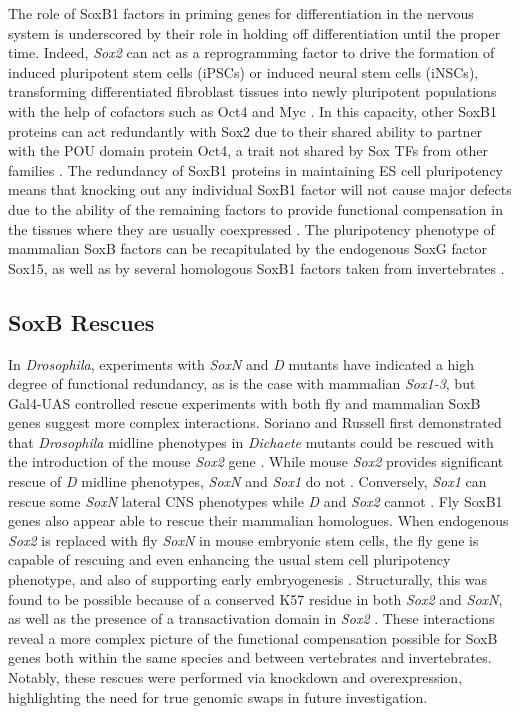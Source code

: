 \documentclass[withindex,glossary]{cam-thesis}
\begin{document}
The role of SoxB1 factors in priming genes for differentiation in the
nervous system is underscored by their role in holding off
differentiation until the proper time. Indeed, \emph{Sox2} can act as a
reprogramming factor to drive the formation of induced pluripotent stem
cells (\gls{iPSCs}) or induced neural stem cells (\gls{iNSCs}), transforming
differentiated fibroblast tissues into newly pluripotent populations
with the help of cofactors such as Oct4 and Myc . In this capacity, other SoxB1
proteins can act redundantly with Sox2 due to their shared ability to
partner with the POU domain protein Oct4, a trait not shared by Sox TFs
from other families . The redundancy of SoxB1
proteins in maintaining ES cell pluripotency means that knocking out any
individual SoxB1 factor will not cause major defects due to the ability
of the remaining factors to provide functional compensation in the
tissues where they are usually coexpressed . The pluripotency phenotype of mammalian SoxB factors can be
recapitulated by the endogenous SoxG factor Sox15, as well as by several
homologous SoxB1 factors taken from invertebrates .

\subsection{SoxB Rescues}

In \emph{Drosophila}, experiments with \emph{SoxN} and \emph{D} mutants
have indicated a high degree of functional redundancy, as is the case
with mammalian \emph{Sox1-3}, but Gal4-UAS controlled rescue experiments
with both fly and mammalian SoxB genes suggest more complex
interactions. Soriano and Russell first demonstrated that
\emph{Drosophila} midline phenotypes in \emph{Dichaete} mutants could be
rescued with the introduction of the mouse \emph{Sox2} gene . While mouse \emph{Sox2} provides significant rescue of
\emph{D} midline phenotypes, \emph{SoxN} and \emph{Sox1} do not
. Conversely, \emph{Sox1} can rescue some \emph{SoxN}
lateral CNS phenotypes while \emph{D} and \emph{Sox2} cannot . Fly SoxB1 genes also appear able to rescue
their mammalian homologues. When endogenous \emph{Sox2} is replaced with
fly \emph{SoxN} in mouse embryonic stem cells, the fly gene is capable
of rescuing and even enhancing the usual stem cell pluripotency
phenotype, and also of supporting early embryogenesis . Structurally, this was found to be possible because of a
conserved K57 residue in both \emph{Sox2} and \emph{SoxN}, as well as
the presence of a transactivation domain in \emph{Sox2} . These interactions reveal a more complex
picture of the functional compensation possible for SoxB genes both
within the same species and between vertebrates and invertebrates.
Notably, these rescues were performed via knockdown and overexpression,
highlighting the need for true genomic swaps in future investigation.
\end{document}
